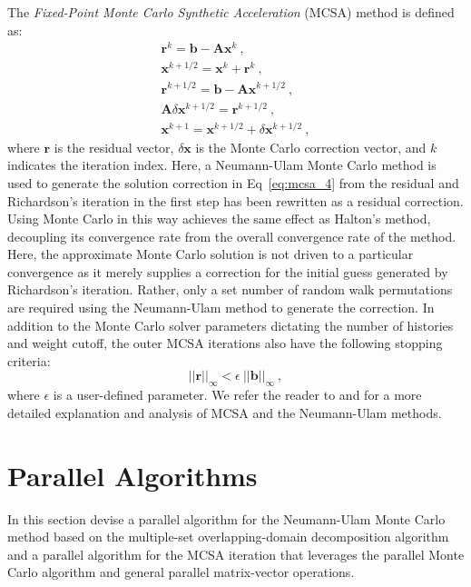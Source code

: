 \documentclass{snamc2013}
\begin{document}
The \textit{Fixed-Point Monte Carlo Synthetic Acceleration} (MCSA)
method is defined as:
\begin{subequations}
  \begin{gather}
    \label{eq:mcsa_1}
    \mathbf{r}^{k} = \mathbf{b} - \mathbf{A}\mathbf{x}^{k}\:,\\
    \label{eq:mcsa_2}
    \mathbf{x}^{k+1/2} = \mathbf{x}^k + \mathbf{r}^k\:,\\
    \label{eq:mcsa_3}
    \mathbf{r}^{k+1/2} = \mathbf{b} - \mathbf{A}\mathbf{x}^{k+1/2}\:,\\
    \label{eq:mcsa_4}
    \mathbf{A}\delta\mathbf{x}^{k+1/2} = \mathbf{r}^{k+1/2}\:,\\
    \label{eq:mcsa_5}
    \mathbf{x}^{k+1} = \mathbf{x}^{k+1/2} + \delta \mathbf{x}^{k+1/2}\:,
  \end{gather}
  \label{eq:mcsa}
\end{subequations}
where $\mathbf{r}$ is the residual vector, $\delta\mathbf{x}$ is the
Monte Carlo correction vector, and $k$ indicates the iteration
index. Here, a Neumann-Ulam Monte Carlo method is used to generate the
solution correction in Eq~\ref{eq:mcsa_4} from the residual and
Richardson's iteration in the first step has been rewritten as a
residual correction. Using Monte Carlo in this way achieves the same
effect as Halton's method, decoupling its convergence rate from the
overall convergence rate of the method. Here, the approximate Monte
Carlo solution is not driven to a particular convergence as it merely
supplies a correction for the initial guess generated by Richardson's
iteration. Rather, only a set number of random walk permutations are
required using the Neumann-Ulam method to generate the correction. In
addition to the Monte Carlo solver parameters dictating the number of
histories and weight cutoff, the outer MCSA iterations also have the
following stopping criteria:
\begin{equation}
  ||\mathbf{r}||_\infty < \epsilon \ ||\mathbf{b}||_\infty\:,
  \label{eq:mcsa_stopping_criteria}
\end{equation}
where $\epsilon$ is a user-defined parameter. We refer the reader to
\cite{evans_monte_2012} and \cite{evans_monte_2009} for a more
detailed explanation and analysis of MCSA and the Neumann-Ulam
methods.

\section{Parallel Algorithms}
In this section devise a parallel algorithm for the Neumann-Ulam Monte
Carlo method based on the multiple-set overlapping-domain
decomposition algorithm and a parallel algorithm for the MCSA
iteration that leverages the parallel Monte Carlo algorithm and
general parallel matrix-vector operations.
\end{document}
